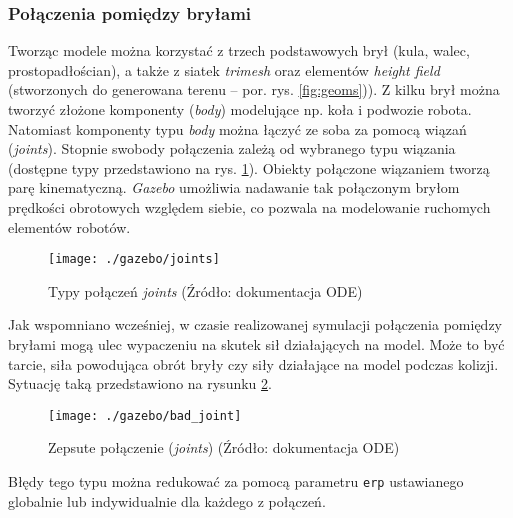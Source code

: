 	
	\subsubsection{Połączenia pomiędzy bryłami }
	Tworząc modele można korzystać z trzech podstawowych brył (kula, walec, prostopadłościan), a także z siatek \textit{trimesh} oraz elementów \textit{height field} (stworzonych do generowana terenu -- por. rys. \ref{fig:geoms})).
	Z kilku brył można tworzyć złożone komponenty (\textit{body}) modelujące np. koła i podwozie robota. Natomiast komponenty typu \textit{body} można łączyć ze soba za pomocą wiązań (\textit{joints}).
	Stopnie swobody połączenia zależą od wybranego typu wiązania (dostępne typy przedstawiono na rys. \ref{fig:joints}). Obiekty połączone wiązaniem tworzą parę kinematyczną.
	\textit{Gazebo} umożliwia nadawanie tak połączonym bryłom prędkości obrotowych względem siebie, co pozwala na modelowanie ruchomych elementów robotów.
	\begin{figure}[H]
	\centering
	\texttt{[image: ./gazebo/joints]}
	\caption{Typy połączeń \textit{joints} (Źródło: dokumentacja ODE) \label{fig:joints}}
	\end{figure}
	Jak wspomniano wcześniej, w czasie realizowanej symulacji połączenia pomiędzy bryłami mogą ulec wypaczeniu na skutek sił działających na model. Może to być tarcie,
	siła powodująca obrót bryły czy siły działające na model podczas kolizji. Sytuację taką przedstawiono na rysunku \ref{fig:bad_joint}.
	\begin{figure}[H]
	\centering
	\texttt{[image: ./gazebo/bad\_joint]}
	\caption{Zepsute połączenie (\textit{joints}) (Źródło: dokumentacja ODE) \label{fig:bad_joint}}
	\end{figure}
	Błędy tego typu można redukować za pomocą parametru \texttt{erp} ustawianego globalnie lub indywidualnie dla każdego z połączeń.
